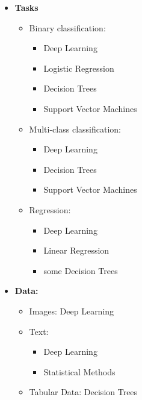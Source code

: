 \begin{itemize}
    \item \textbf{Tasks}

\begin{itemize}
        \item Binary classification:

    \begin{itemize}
            \item Deep Learning
            \item Logistic Regression
            \item Decision Trees
            \item Support Vector Machines
    \end{itemize}

        \item Multi-class classification:

    \begin{itemize}
            \item Deep Learning
            \item Decision Trees
            \item Support Vector Machines
    \end{itemize}

        \item Regression:

    \begin{itemize}
            \item Deep Learning
            \item Linear Regression
            \item some Decision Trees
    \end{itemize}

\end{itemize}

    \item \textbf{Data:}

\begin{itemize}
        \item Images:
Deep Learning

        \item Text:

    \begin{itemize}
            \item Deep Learning
            \item Statistical Methods
    \end{itemize}

        \item Tabular Data:
Decision Trees


\end{itemize}
\end{itemize}
